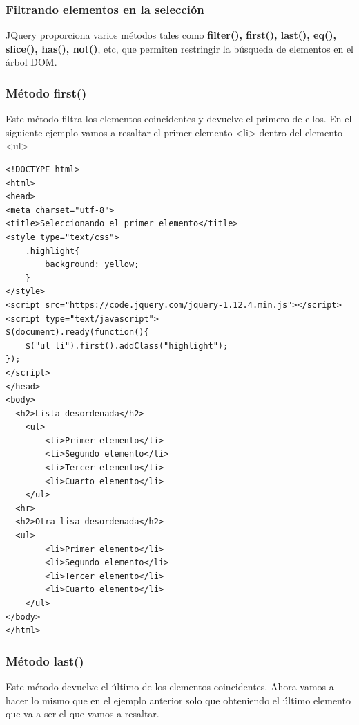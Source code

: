 \documentclass[11pt]{article}
\begin{document}
\subsubsection*{Filtrando elementos en la selección}
\label{sec:org70ab966}

JQuery proporciona varios métodos tales como \textbf{filter(), first(), last(), eq(), slice(), has(), not()}, etc, que permiten restringir la búsqueda de elementos en el árbol DOM. 

\subsubsection*{Método first()}
\label{sec:org1b191a6}

Este método filtra los elementos coincidentes y devuelve el primero de ellos. En el siguiente ejemplo vamos a resaltar el primer elemento <li> dentro del elemento <ul>

\begin{verbatim}
<!DOCTYPE html>
<html>
<head>
<meta charset="utf-8">
<title>Seleccionando el primer elemento</title>
<style type="text/css">
    .highlight{
        background: yellow;
    }        
</style>
<script src="https://code.jquery.com/jquery-1.12.4.min.js"></script>
<script type="text/javascript">
$(document).ready(function(){
    $("ul li").first().addClass("highlight");
});
</script>
</head>
<body>
  <h2>Lista desordenada</h2>
    <ul>
        <li>Primer elemento</li>
        <li>Segundo elemento</li>
        <li>Tercer elemento</li>
        <li>Cuarto elemento</li>
    </ul>
  <hr>
  <h2>Otra lisa desordenada</h2>
  <ul>
        <li>Primer elemento</li>
        <li>Segundo elemento</li>
        <li>Tercer elemento</li>
        <li>Cuarto elemento</li>
    </ul>
</body>
</html>                                		
\end{verbatim}

\subsubsection*{Método last()}
\label{sec:orgeaee809}

Este método devuelve el último de los elementos coincidentes. Ahora vamos a hacer lo mismo que en el ejemplo anterior solo que obteniendo el último elemento que va a ser el que vamos a resaltar.
\end{document}
